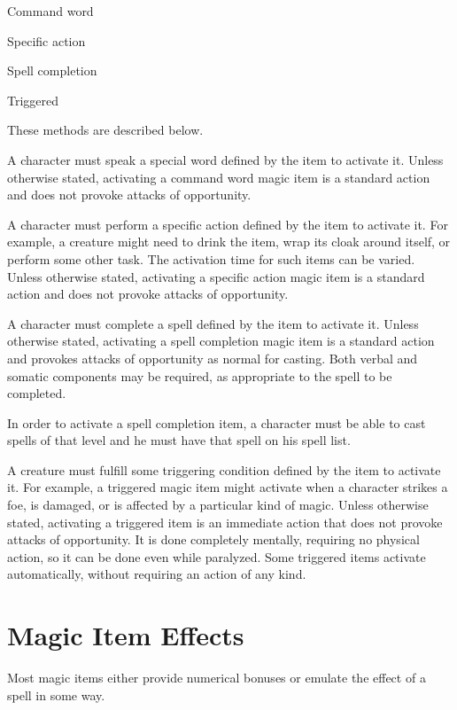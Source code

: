 \begin{itemize*}
  \item Command word
  \item Specific action
  \item Spell completion
  \item Triggered
\end{itemize*}

These methods are described below.

 A character must speak a special word defined by the item to activate it. Unless otherwise stated, activating a command word magic item is a standard action and does not provoke attacks of opportunity.

 A character must perform a specific action defined by the item to activate it. For example, a creature might need to drink the item, wrap its cloak around itself, or perform some other task. The activation time for such items can be varied. Unless otherwise stated, activating a specific action magic item is a standard action and does not provoke attacks of opportunity.

 A character must complete a spell defined by the item to activate it. Unless otherwise stated, activating a spell completion magic item is a standard action and provokes attacks of opportunity as normal for casting. Both verbal and somatic components may be required, as appropriate to the spell to be completed.

In order to activate a spell completion item, a character must be able to cast spells of that level and he must have that spell on his spell list.

 A creature must fulfill some triggering condition defined by the item to activate it. For example, a triggered magic item might activate when a character strikes a foe, is damaged, or is affected by a particular kind of magic. Unless otherwise stated, activating a triggered item is an immediate action that does not provoke attacks of opportunity. It is done completely mentally, requiring no physical action, so it can be done even while paralyzed. Some triggered items activate automatically, without requiring an action of any kind.

\section{Magic Item Effects}
Most magic items either provide numerical bonuses or emulate the effect of a spell in some way.

